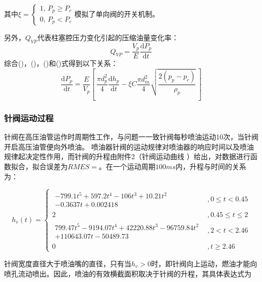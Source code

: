 \documentclass[withoutpreface,bwprint]{cumcmthesis} %
\begin{document}
			其中$\xi = \left\{ \begin{aligned}  1, \, P_p \geq P_c \\ 0, \, P_p < P_c \end{aligned} \right.$模拟了单向阀的开关机制。
			
			另外，$Q_{VP}$代表柱塞腔压力变化引起的压缩油量变化率：
			$$
			Q_{VP} = \frac{V_p}{E} \frac{\mathrm{d}P_p}{\mathrm{d}t}
			$$
			综合()，()，()和()式得到以下关系：
			\begin{equation}
				\frac{\mathrm{d}P_p}{\mathrm{d}t} = \frac{E}{V_p} \left[ \, \frac{\pi d_p^2}{4}  \frac{\mathrm{d}h_p}{\mathrm{d}t} - \xi C \frac{\pi d_{in}^2}{4} \sqrt{\frac{2(p_p - p_c)}{\rho_p}} \, \right]
			\end{equation}
			
			
			
			
			\subsubsection{针阀运动过程}
			
			针阀在高压油管运作时周期性工作，与问题一一致针阀每秒喷油运动10次，当针阀开启高压油管便向外喷油。
			喷油器针阀的运动规律对喷油器的响应时间以及喷油规律起决定性作用，而针阀的升程由附件2（针阀运动曲线 ）给出，对数据进行函数拟合，拟合误差为$RMES = $。在一个运动周期$100ms$内，升程与时间的关系为：
			
			\begin{equation}
			h_v(t) = \left\{ \begin{array}{ll} \begin{array}{ll}
			-799.1 t^5 + 597.2 t^4 - 106 t^3 + 10.21 t^2 \\ -  0.3637 t + 0.002418 \end{array} &, 0 \leq t < 0.45 \\
			2 &, 0.45 \leq t \leq 2 \\
			\begin{array}{ll}
			799.47t^5 - 9194.07 t^4 + 42220.88 t^3 - 96759.84 t^2 \\ + 110643.07 t - 50489.73 
			\end{array} &, 2 < t < 2.46 \\
			0 &, t \geq 2.46
			\end{array} \right.
			\end{equation}
			
			针阀宽度直径大于喷油嘴的直径，只有当$h_v > 0$时，即针阀向上运动，燃油才能向喷孔流动喷出。因此，喷油的有效横截面积取决于针阀的升程，其具体表达式为
			
\end{document}
